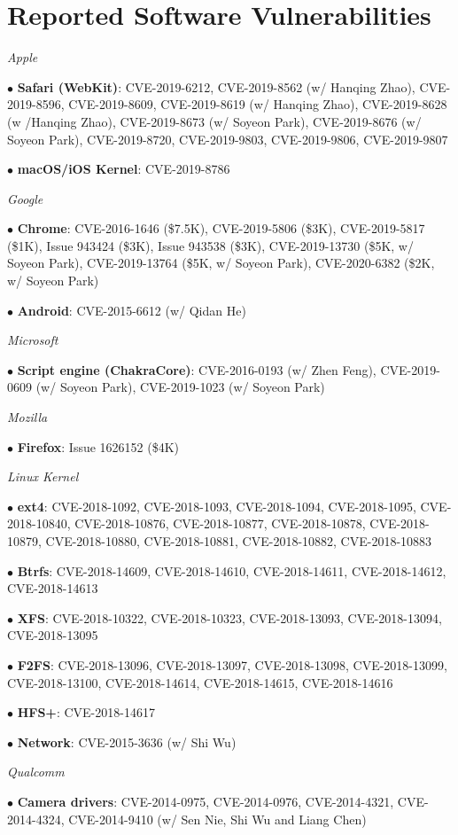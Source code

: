 \section*{Reported Software Vulnerabilities}
\begin{description}
\item {\emph{Apple}}
\item $\bullet$ \textbf{Safari (WebKit)}: 
	CVE-2019-6212,
	CVE-2019-8562 (w/ Hanqing Zhao), 
	CVE-2019-8596, 
	CVE-2019-8609,
	CVE-2019-8619 (w/ Hanqing Zhao), 
	CVE-2019-8628 (w /Hanqing Zhao), 
	CVE-2019-8673 (w/ Soyeon Park), 
	CVE-2019-8676 (w/ Soyeon Park), 
	CVE-2019-8720,
	CVE-2019-9803,
	CVE-2019-9806,
	CVE-2019-9807

\item $\bullet$ \textbf{macOS/iOS Kernel}: CVE-2019-8786

\item {\emph{Google}}
\item $\bullet$ \textbf{Chrome}: 
	CVE-2016-1646 (\$7.5K),
	CVE-2019-5806 (\$3K), 
	CVE-2019-5817 (\$1K), 
	Issue 943424 (\$3K), 
	Issue 943538 (\$3K), 
	CVE-2019-13730 (\$5K, w/ Soyeon Park), 
	CVE-2019-13764 (\$5K, w/ Soyeon Park), 
	CVE-2020-6382 (\$2K, w/ Soyeon Park)

\item $\bullet$ \textbf{Android}: CVE-2015-6612 (w/ Qidan He)

\item {\emph{Microsoft}}
	\item $\bullet$ \textbf{Script engine (ChakraCore)}: 
		CVE-2016-0193 (w/ Zhen Feng), 
		CVE-2019-0609 (w/ Soyeon Park), 
		CVE-2019-1023 (w/ Soyeon Park)

\item {\emph{Mozilla}}
	\item $\bullet$ \textbf{Firefox}:
		Issue 1626152 (\$4K)

\item {\emph{Linux Kernel}}
    \item $\bullet$ \textbf{ext4}: 
    	CVE-2018-1092,
    	CVE-2018-1093,
    	CVE-2018-1094,
    	CVE-2018-1095,
    	CVE-2018-10840,
    	CVE-2018-10876,
    	CVE-2018-10877,
    	CVE-2018-10878,
    	CVE-2018-10879,
    	CVE-2018-10880,
    	CVE-2018-10881,
    	CVE-2018-10882,
    	CVE-2018-10883
    \item $\bullet$ \textbf{Btrfs}: 
    	CVE-2018-14609,
    	CVE-2018-14610,
    	CVE-2018-14611,
    	CVE-2018-14612,
    	CVE-2018-14613
    \item $\bullet$ \textbf{XFS}: 
        CVE-2018-10322,
    	CVE-2018-10323,
    	CVE-2018-13093,
    	CVE-2018-13094,
    	CVE-2018-13095
    \item $\bullet$ \textbf{F2FS}: 
    	CVE-2018-13096,
    	CVE-2018-13097,
    	CVE-2018-13098,
    	CVE-2018-13099,
    	CVE-2018-13100,
    	CVE-2018-14614,
    	CVE-2018-14615,
    	CVE-2018-14616
	\item $\bullet$ \textbf{HFS+}: CVE-2018-14617
	\item $\bullet$ \textbf{Network}: CVE-2015-3636 (w/ Shi Wu)

\item {\emph{Qualcomm}}
	\item $\bullet$ \textbf{Camera drivers}: 
		CVE-2014-0975, 
		CVE-2014-0976, 
		CVE-2014-4321, 
		CVE-2014-4324, 
		CVE-2014-9410 (w/ Sen Nie, Shi Wu and Liang Chen)
\end{description}

